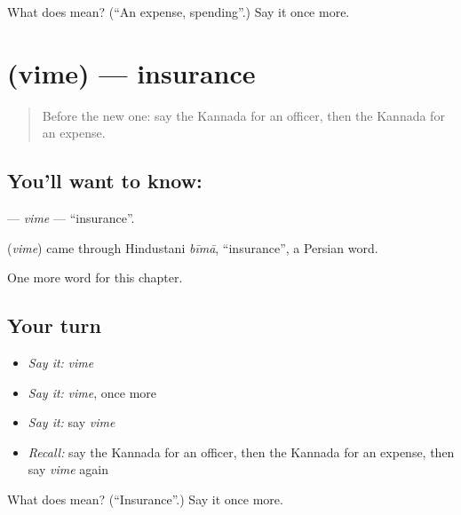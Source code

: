 \begin{tcolorbox}[breakable,colback=teal!4,colframe=teal!35!black,title={Before you move on}]
What does  mean? (\textquotedblleft{}An expense, spending\textquotedblright{}.) Say it once more.
\end{tcolorbox}
\section[\texorpdfstring{\kn{ವಿಮೆ} (vime)}{ವಿಮೆ (vime)}]{ (vime) — insurance}

\label{lesson:KA-C232-vime}



\begin{quote}
Before the new one: say the Kannada for an officer, then the Kannada for an expense.
\end{quote}

\subsection*{You'll want to know: }
\textbf{} — \emph{vime} — \textquotedblleft{}insurance\textquotedblright{}.

\begin{cousinweb}
\textbf{} (\emph{vime}) came through Hindustani \emph{bīmā}, \textquotedblleft{}insurance\textquotedblright{}, a Persian word.
\end{cousinweb}

\begin{grammarlens}[title={What you've built}]
One more word for this chapter.
\end{grammarlens}

\subsection*{Your turn}
\begin{itemize}
\raggedright
  \item \emph{Say it:} \emph{vime}
  \item \emph{Say it:} \emph{vime}, once more
  \item \emph{Say it:} say \emph{vime}
  \item \emph{Recall:} say the Kannada for an officer, then the Kannada for an expense, then say \emph{vime} again
\end{itemize}

\begin{tcolorbox}[breakable,colback=teal!4,colframe=teal!35!black,title={Before you move on}]
What does  mean? (\textquotedblleft{}Insurance\textquotedblright{}.) Say it once more.
\end{tcolorbox}

